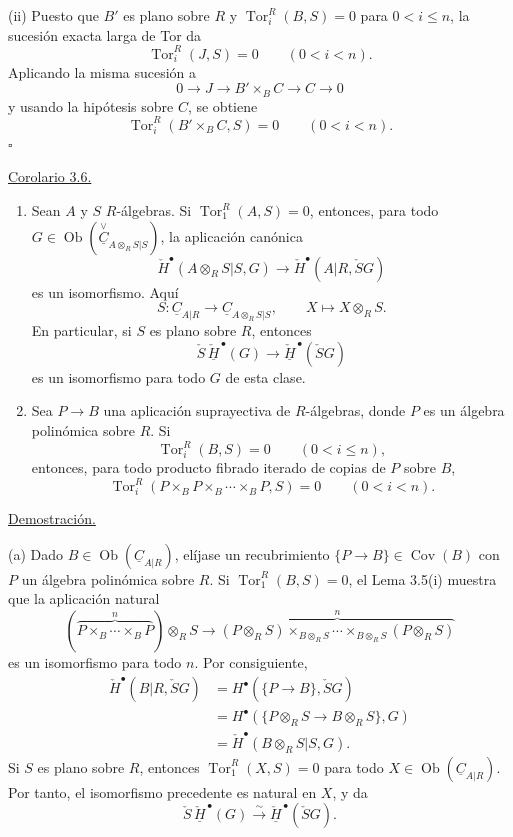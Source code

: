 (ii) Puesto que $B'$ es plano sobre $R$ y
$\operatorname{Tor}_i^R(B,S)=0$ para $0<i\leq n$, la sucesión exacta
larga de Tor da
\[
 \operatorname{Tor}_i^R(J,S)=0\qquad(0<i<n).
\]
Aplicando la misma sucesión a
\[
 0\longrightarrow J\longrightarrow B'\times_BC
 \longrightarrow C\longrightarrow0
\]
y usando la hipótesis sobre $C$, se obtiene
\[
 \operatorname{Tor}_i^R(B'\times_BC,S)=0\qquad(0<i<n).
\]
\hfill$\square$

\underline{Corolario 3.6.}

\begin{enumerate}[label=(\alph*)]
\item Sean $A$ y $S$ $R$-álgebras. Si
$\operatorname{Tor}_1^R(A,S)=0$, entonces, para todo
$G\in\operatorname{Ob}
(\overset{\vee}{\underline C}_{A\otimes_RS|S})$, la aplicación canónica
\[
 \check H^{\bullet}(A\otimes_RS|S,G)
 \longrightarrow\check H^{\bullet}(A|R,\check SG)
\]
es un isomorfismo. Aquí
\[
 S:\underline C_{A|R}\longrightarrow
 \underline C_{A\otimes_RS|S},
 \qquad X\longmapsto X\otimes_RS.
\]
En particular, si $S$ es plano sobre $R$, entonces
\[
 \check S\,\check{\underline H}^{\,\bullet}(G)
 \longrightarrow
 \check{\underline H}^{\,\bullet}(\check SG)
\]
es un isomorfismo para todo $G$ de esta clase.

\item Sea $P\longrightarrow B$ una aplicación suprayectiva de
$R$-álgebras, donde $P$ es un álgebra polinómica sobre $R$. Si
\[
 \operatorname{Tor}_i^R(B,S)=0\qquad(0<i\leq n),
\]
entonces, para todo producto fibrado iterado de copias de $P$ sobre $B$,
\[
 \operatorname{Tor}_i^R
 (P\times_B P\times_B\cdots\times_B P,S)=0
 \qquad(0<i<n).
\]
\end{enumerate}

\underline{Demostración.}

(a) Dado $B\in\operatorname{Ob}(\underline C_{A|R})$, elíjase un
recubrimiento $\{P\longrightarrow B\}\in\operatorname{Cov}(B)$ con $P$
un álgebra polinómica sobre $R$. Si
$\operatorname{Tor}_1^R(B,S)=0$, el Lema 3.5(i) muestra que la aplicación
natural
\[
 \left(\overbrace{P\times_B\cdots\times_BP}^{n}\right)\otimes_RS
 \longrightarrow
 \overbrace{(P\otimes_RS)\times_{B\otimes_RS}\cdots
 \times_{B\otimes_RS}(P\otimes_RS)}^{n}
\]
es un isomorfismo para todo $n$. Por consiguiente,
\begin{align*}
 \check H^{\bullet}(B|R,\check SG)
 &=H^{\bullet}(\{P\longrightarrow B\},\check SG)\\
 &=H^{\bullet}(\{P\otimes_RS\longrightarrow B\otimes_RS\},G)\\
 &=\check H^{\bullet}(B\otimes_RS|S,G).
\end{align*}
Si $S$ es plano sobre $R$, entonces
$\operatorname{Tor}_1^R(X,S)=0$ para todo
$X\in\operatorname{Ob}(\underline C_{A|R})$. Por tanto, el isomorfismo
precedente es natural en $X$, y da
\[
 \check S\,\check{\underline H}^{\,\bullet}(G)
 \xrightarrow{\ \sim\ }
 \check{\underline H}^{\,\bullet}(\check SG).
\]

